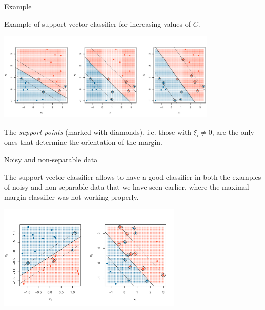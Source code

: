 \documentclass[notes]{beamer}          %
\begin{document}
\begin{frame}{Example}

Example of support vector classifier for increasing values of $C$.

\begin{center}
\includegraphics[height=4.2cm]{../figures/week_2_classification/svm_support_vector_classifier_regularization_C.pdf}  
\end{center}

The \textit{support points} (marked with diamonds), i.e. those with $\xi_i \neq 0$, are the only ones that determine the orientation of the margin.

\end{frame}

\begin{frame}{Noisy and non-separable data}

The support vector classifier allows to have a good classifier in both the examples of noisy and non-separable data that we have seen earlier, where the maximal margin classifier was not working properly.

\begin{center}
\includegraphics[height=5cm]{../figures/week_2_classification/svm_outlier_or_not_separable_support_vector_classifier.pdf}  
\end{center}

\end{frame}
\end{document}
